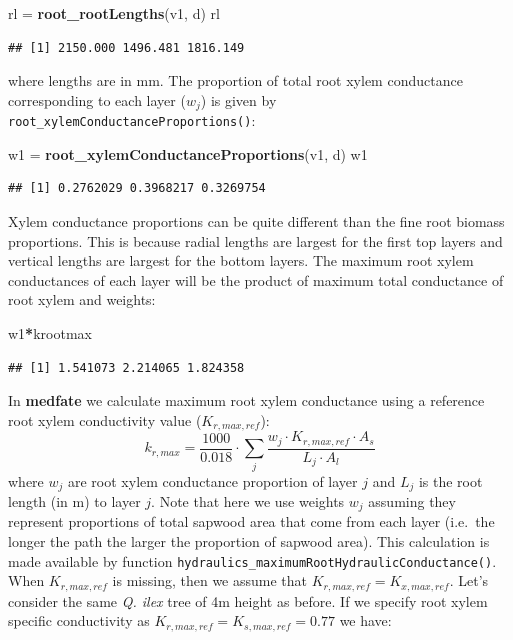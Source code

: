 \documentclass[]{book}
\newenvironment{Shaded}{\begin{snugshade}}{\end{snugshade}}
\newcommand{\KeywordTok}[1]{\textcolor[rgb]{0.13,0.29,0.53}{\textbf{#1}}}
\newcommand{\StringTok}[1]{\textcolor[rgb]{0.31,0.60,0.02}{#1}}
\newcommand{\OperatorTok}[1]{\textcolor[rgb]{0.81,0.36,0.00}{\textbf{#1}}}
\newcommand{\NormalTok}[1]{#1}
\begin{document}
\begin{Shaded}
\begin{Highlighting}[]
\NormalTok{rl =}\StringTok{ }\KeywordTok{root_rootLengths}\NormalTok{(v1, d)}
\NormalTok{rl}
\end{Highlighting}
\end{Shaded}

\begin{verbatim}
## [1] 2150.000 1496.481 1816.149
\end{verbatim}

where lengths are in mm. The proportion of total root xylem conductance corresponding to each layer (\(w_j\)) is given by \texttt{root\_xylemConductanceProportions()}:

\begin{Shaded}
\begin{Highlighting}[]
\NormalTok{w1 =}\StringTok{ }\KeywordTok{root_xylemConductanceProportions}\NormalTok{(v1, d)}
\NormalTok{w1}
\end{Highlighting}
\end{Shaded}

\begin{verbatim}
## [1] 0.2762029 0.3968217 0.3269754
\end{verbatim}

Xylem conductance proportions can be quite different than the fine root biomass proportions. This is because radial lengths are largest for the first top layers and vertical lengths are largest for the bottom layers. The maximum root xylem conductances of each layer will be the product of maximum total conductance of root xylem and weights:

\begin{Shaded}
\begin{Highlighting}[]
\NormalTok{w1}\OperatorTok{*}\NormalTok{krootmax}
\end{Highlighting}
\end{Shaded}

\begin{verbatim}
## [1] 1.541073 2.214065 1.824358
\end{verbatim}

In \textbf{medfate} we calculate maximum root xylem conductance using a reference root xylem conductivity value (\(K_{r,max,ref}\)):
\begin{equation}
k_{r,max}=\frac{1000}{0.018} \cdot \sum_{j}{\frac{w_j \cdot K_{r,max,ref}\cdot A_{s}}{L_j\cdot A_{l}}}
\end{equation}
where \(w_j\) are root xylem conductance proportion of layer \(j\) and \(L_j\) is the root length (in m) to layer \(j\). Note that here we use weights \(w_j\) assuming they represent proportions of total sapwood area that come from each layer (i.e.~the longer the path the larger the proportion of sapwood area). This calculation is made available by function \texttt{hydraulics\_maximumRootHydraulicConductance()}. When \(K_{r,max,ref}\) is missing, then we assume that \(K_{r,max,ref} = K_{x,max,ref}\). Let's consider the same \emph{Q. ilex} tree of 4m height as before. If we specify root xylem specific conductivity as \(K_{r,max,ref} = K_{s,max,ref} =0.77\) we have:
\end{document}
